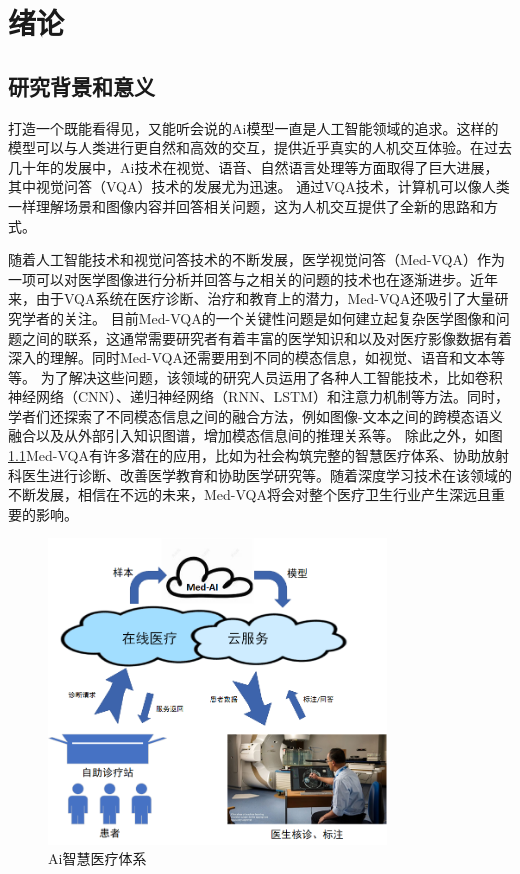 \chapter{绪论}
%
\section{研究背景和意义}
打造一个既能看得见，又能听会说的Ai模型一直是人工智能领域的追求。这样的模型可以与人类进行更自然和高效的交互，提供近乎真实的人机交互体验。在过去几十年的发展中，Ai技术在视觉、语音、自然语言处理等方面取得了巨大进展，其中视觉问答（VQA）技术的发展尤为迅速。
通过VQA技术\cite{yu2015visual}，计算机可以像人类一样理解场景和图像内容并回答相关问题\cite{wu2017visual}，这为人机交互提供了全新的思路和方式。

随着人工智能技术和视觉问答技术的不断发展，医学视觉问答（Med-VQA）作为一项可以对医学图像进行分析并回答与之相关的问题的技术也在逐渐进步。近年来，由于VQA系统在医疗诊断、治疗和教育上的潜力，Med-VQA还吸引了大量研究学者的关注\cite{daibu}。
目前Med-VQA的一个关键性问题是如何建立起复杂医学图像和问题之间的联系，这通常需要研究者有着丰富的医学知识和以及对医疗影像数据有着深入的理解。同时Med-VQA还需要用到不同的模态信息，如视觉、语音和文本等等。
为了解决这些问题，该领域的研究人员运用了各种人工智能技术，比如卷积神经网络（CNN）、递归神经网络（RNN、LSTM）和注意力机制等方法\cite{teney2017visual}。同时，学者们还探索了不同模态信息之间的融合方法\cite{lin2021medical}，例如图像-文本之间的跨模态语义融合以及从外部引入知识图谱，增加模态信息间的推理关系等。
除此之外，如图\ref{sys_medaicloud}Med-VQA有许多潜在的应用，比如为社会构筑完整的智慧医疗体系、协助放射科医生进行诊断、改善医学教育和协助医学研究等。随着深度学习技术在该领域的不断发展，相信在不远的未来，Med-VQA将会对整个医疗卫生行业产生深远且重要的影响。
\begin{figure}[htbp]
	\centering	
	\includegraphics[width=0.8\textwidth]{Fig/myfig/chapter1/sys_medaicloud.png}  %
	\caption{\label{sys_medaicloud}Ai智慧医疗体系} 
\end{figure}

